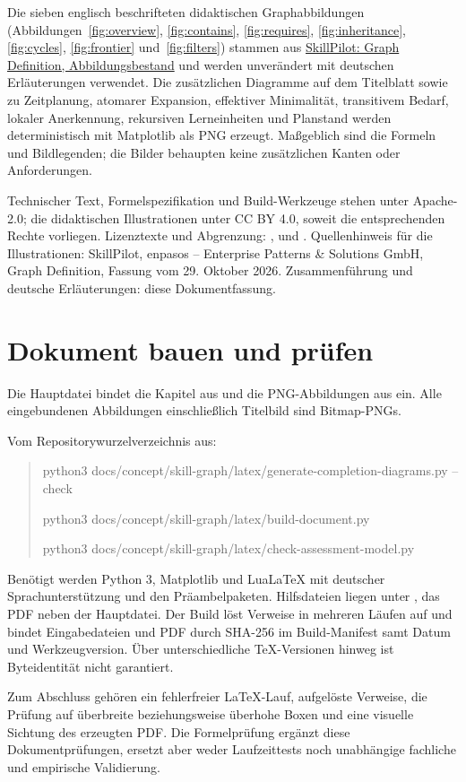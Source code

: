 Die sieben englisch beschrifteten didaktischen Graphabbildungen
(Abbildungen~\ref{fig:overview}, \ref{fig:contains}, \ref{fig:requires},
\ref{fig:inheritance}, \ref{fig:cycles}, \ref{fig:frontier}
und~\ref{fig:filters}) stammen aus
\href{https://github.com/enpasos/skillpilot/tree/main/docs/concept/skill-graph/assets/graph-definition}{SkillPilot: Graph Definition, Abbildungsbestand}
und werden unverändert mit deutschen Erläuterungen verwendet.
Die zusätzlichen Diagramme auf dem Titelblatt sowie zu Zeitplanung,
atomarer Expansion, effektiver Minimalität, transitivem Bedarf, lokaler
Anerkennung, rekursiven Lerneinheiten und Planstand werden deterministisch
mit Matplotlib als PNG erzeugt. Maßgeblich sind die Formeln und Bildlegenden;
die Bilder behaupten keine zusätzlichen Kanten oder Anforderungen.

Technischer Text, Formelspezifikation und Build-Werkzeuge stehen unter
Apache-2.0; die didaktischen Illustrationen unter CC BY 4.0, soweit die
entsprechenden Rechte vorliegen. Lizenztexte und Abgrenzung:
,
 und
.
Quellenhinweis für die Illustrationen: SkillPilot, enpasos -- Enterprise
Patterns \& Solutions GmbH, Graph Definition, Fassung vom 29. Oktober 2026.
Zusammenführung und deutsche Erläuterungen: diese Dokumentfassung.

\section{Dokument bauen und prüfen}
\label{sec:build}
Die Hauptdatei  bindet die Kapitel
aus  und die PNG-Abbildungen aus
 ein. Alle eingebundenen Abbildungen
einschließlich Titelbild sind Bitmap-PNGs.

Vom Repositorywurzelverzeichnis aus:
\begin{quote}\scriptsize\ttfamily
python3 docs/concept/skill-graph/latex/generate-completion-diagrams.py --check\par
python3 docs/concept/skill-graph/latex/build-document.py\par
python3 docs/concept/skill-graph/latex/check-assessment-model.py
\end{quote}
Benötigt werden Python 3, Matplotlib und LuaLaTeX mit deutscher Sprachunterstützung
und den Präambelpaketen. Hilfsdateien liegen unter
, das PDF neben der Hauptdatei.
Der Build löst Verweise in mehreren Läufen auf und bindet Eingabedateien
und PDF durch SHA-256 im Build-Manifest samt Datum und Werkzeugversion.
Über unterschiedliche TeX-Versionen hinweg ist Byteidentität nicht garantiert.

Zum Abschluss gehören ein fehlerfreier LaTeX-Lauf, aufgelöste Verweise,
die Prüfung auf überbreite beziehungsweise überhohe Boxen und eine
visuelle Sichtung des erzeugten PDF. Die Formelprüfung ergänzt diese
Dokumentprüfungen, ersetzt aber weder Laufzeittests noch unabhängige
fachliche und empirische Validierung.
